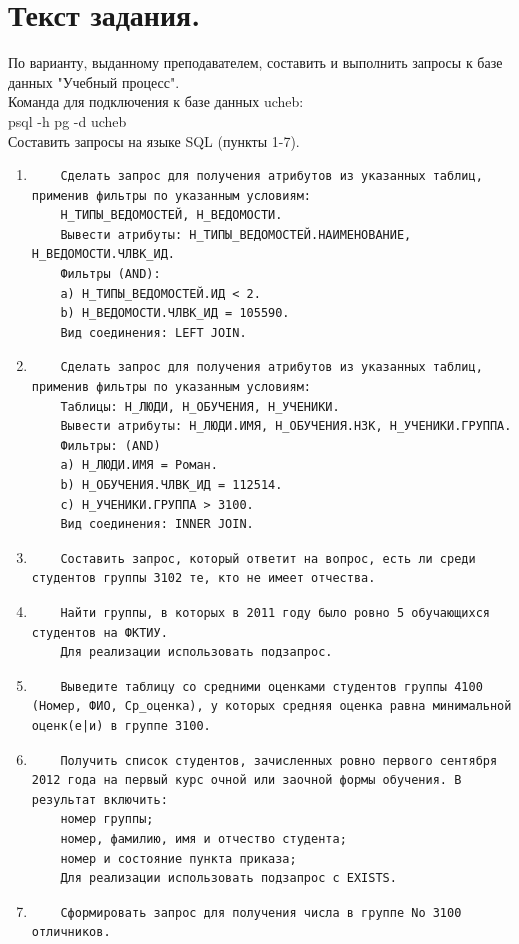\documentclass[12pt,onecolumn]{article}
\begin{document}
\section{Текст задания.}
По варианту, выданному преподавателем, составить и выполнить запросы к базе данных "Учебный процесс".\\
Команда для подключения к базе данных ucheb:\\
psql -h pg -d ucheb\\
Составить запросы на языке SQL (пункты 1-7).
\begin{enumerate}
  \item 
    \begin{verbatim}
    Сделать запрос для получения атрибутов из указанных таблиц, применив фильтры по указанным условиям:
    Н_ТИПЫ_ВЕДОМОСТЕЙ, Н_ВЕДОМОСТИ.
    Вывести атрибуты: Н_ТИПЫ_ВЕДОМОСТЕЙ.НАИМЕНОВАНИЕ, Н_ВЕДОМОСТИ.ЧЛВК_ИД.
    Фильтры (AND):
    a) Н_ТИПЫ_ВЕДОМОСТЕЙ.ИД < 2.
    b) Н_ВЕДОМОСТИ.ЧЛВК_ИД = 105590.
    Вид соединения: LEFT JOIN.
  \end{verbatim}
  \item \begin{verbatim}
    Сделать запрос для получения атрибутов из указанных таблиц, применив фильтры по указанным условиям:
    Таблицы: Н_ЛЮДИ, Н_ОБУЧЕНИЯ, Н_УЧЕНИКИ.
    Вывести атрибуты: Н_ЛЮДИ.ИМЯ, Н_ОБУЧЕНИЯ.НЗК, Н_УЧЕНИКИ.ГРУППА.
    Фильтры: (AND)
    a) Н_ЛЮДИ.ИМЯ = Роман.
    b) Н_ОБУЧЕНИЯ.ЧЛВК_ИД = 112514.
    c) Н_УЧЕНИКИ.ГРУППА > 3100.
    Вид соединения: INNER JOIN.
  \end{verbatim}
  \item \begin{verbatim}
    Составить запрос, который ответит на вопрос, есть ли среди студентов группы 3102 те, кто не имеет отчества.
  \end{verbatim}
  \item \begin{verbatim}
    Найти группы, в которых в 2011 году было ровно 5 обучающихся студентов на ФКТИУ.
    Для реализации использовать подзапрос.
  \end{verbatim}
  \item \begin{verbatim}
    Выведите таблицу со средними оценками студентов группы 4100 (Номер, ФИО, Ср_оценка), у которых средняя оценка равна минимальной оценк(е|и) в группе 3100.
  \end{verbatim}
  \item \begin{verbatim}
    Получить список студентов, зачисленных ровно первого сентября 2012 года на первый курс очной или заочной формы обучения. В результат включить:
    номер группы;
    номер, фамилию, имя и отчество студента;
    номер и состояние пункта приказа;
    Для реализации использовать подзапрос с EXISTS.
  \end{verbatim}
  \item \begin{verbatim}
    Сформировать запрос для получения числа в группе No 3100 отличников.
  \end{verbatim}

\end{enumerate}
\end{document}

